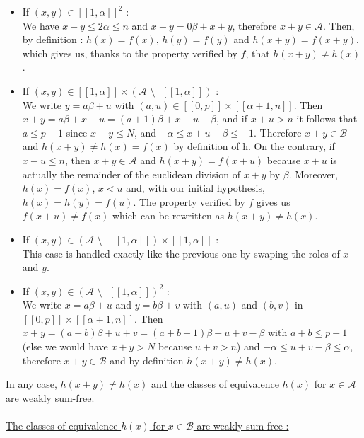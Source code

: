 \begin{itemize}
	\item If $(x,y) \in [\![1,\alpha]\!]^2$ :\\
	We have $x + y \leqslant 2\alpha \leqslant n$ and $x + y = 0\beta + x + y$, therefore $x + y \in \mathcal{A}$. Then, by definition : $h(x) = f(x)$, $h(y) = f(y)$ and $h(x+y) = f(x+y)$, which gives us, thanks to the property verified by $f$, that $h(x+y) \neq h(x)$.
	\item If $(x,y) \in [\![1,\alpha]\!] \times ( \mathcal{A} \text{ \textbackslash} \text{ } [\![1,\alpha]\!] )$ :\\
	We write $y = a\beta + u$ with $(a,u) \in [\![0,p]\!] \times [\![\alpha + 1,n]\!]$. Then $x+y = a\beta + x + u = (a+1)\beta + x + u - \beta$, and if $x + u > n$ it follows that $a \leqslant p-1$ since $x+y \leqslant N$, and $-\alpha \leqslant x + u - \beta \leqslant -1$. Therefore $x+y \in \mathcal{B}$ and $h(x+y) \neq h(x) = f(x)$ by definition of h. On the contrary, if $x - u \leqslant n$, then $x+y \in \mathcal{A}$ and $h(x+y) = f(x+u)$ because $x+u$ is actually the remainder of the euclidean division of $x+y$ by $\beta$. Moreover, $h(x) = f(x)$, $x < u$ and, with our initial hypothesis, $h(x) = h(y) = f(u)$. The property verified by $f$ gives us $f(x+u) \neq f(x)$ which can be rewritten as $h(x+y) \neq h(x)$.
	\item If $(x,y) \in ( \mathcal{A} \text{ \textbackslash} \text{ } [\![1,\alpha]\!] ) \times [\![1,\alpha]\!]$ : \\
	This case is handled exactly like the previous one by swaping the roles of $x$ and $y$.
	\item If $(x,y) \in ( \mathcal{A} \text{ \textbackslash} \text{ } [\![1,\alpha]\!] )^2$ : \\
	We write $x = a\beta + u$ and $y = b\beta + v$ with $(a,u)$ and $(b,v)$ in $[\![0,p]\!] \times [\![\alpha + 1,n]\!]$. Then $x+y = (a+b)\beta + u+v = (a+b+1)\beta + u + v - \beta$ with $a+b \leqslant p-1$ (else we would have $x+y > N$ because $u+v > n$) and $-\alpha \leqslant u + v - \beta \leqslant \alpha$, therefore $x+y \in \mathcal{B}$ and by definition $h(x+y) \neq h(x)$.
\end{itemize}
In any case, $h(x+y) \neq h(x)$ and the classes of equivalence $h(x)$ for $x \in \mathcal{A}$ are weakly sum-free.\\
\\
\underline{The classes of equivalence $h(x)$ for $x \in \mathcal{B}$ are weakly sum-free :}
\\
\\
